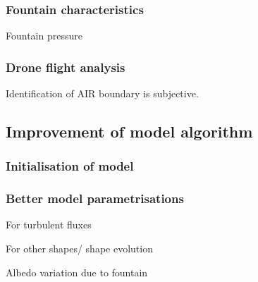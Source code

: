 \subsubsection{Fountain characteristics}

Fountain pressure

\subsubsection{Drone flight analysis}

Identification of AIR boundary is subjective.

\subsection{Improvement of model algorithm}

\subsubsection{Initialisation of model}

\subsubsection{Better model parametrisations}

For turbulent fluxes

For other shapes/ shape evolution

Albedo variation due to fountain




